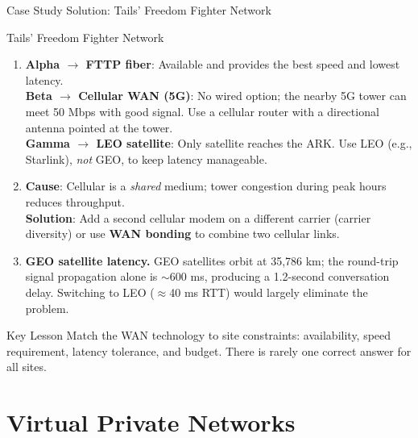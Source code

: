\documentclass[aspectratio=169]{beamer}  %
\begin{document}
\begin{frame}[t]{Case Study Solution: Tails' Freedom Fighter Network}
    \begin{casesolution}{Tails' Freedom Fighter Network}
        \begin{enumerate}
            \footnotesize
            \item \textbf{Alpha $\rightarrow$ FTTP fiber}: Available and provides the best speed and lowest latency. \\
                  \textbf{Beta $\rightarrow$ Cellular WAN (5G)}: No wired option; the nearby 5G tower can meet 50 Mbps with good signal. Use a cellular router with a directional antenna pointed at the tower. \\
                  \textbf{Gamma $\rightarrow$ LEO satellite}: Only satellite reaches the ARK. Use LEO (e.g., Starlink), \textit{not} GEO, to keep latency manageable.
            \item \textbf{Cause}: Cellular is a \textit{shared} medium; tower congestion during peak hours reduces throughput.\\
                  \textbf{Solution}: Add a second cellular modem on a different carrier (carrier diversity) or use \textbf{WAN bonding} to combine two cellular links.
            \item \textbf{GEO satellite latency.} GEO satellites orbit at 35,786 km; the round-trip signal propagation alone is $\sim$600 ms, producing a 1.2-second conversation delay. Switching to LEO ($\approx$40 ms RTT) would largely eliminate the problem.
        \end{enumerate}
    \end{casesolution}
    \vspace{0.2em}
    \begin{alertblock}{Key Lesson}
        \footnotesize Match the WAN technology to site constraints: availability, speed requirement, latency tolerance, and budget. There is rarely one correct answer for all sites.
    \end{alertblock}
\end{frame}

\section{Virtual Private Networks}
\end{document}
